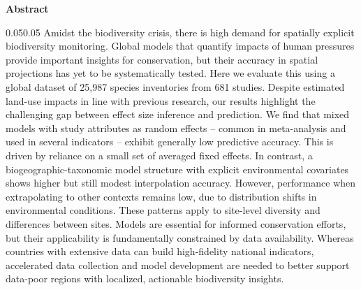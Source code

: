 
\vspace{3\baselineskip}

\begin{center}
  {\large\bfseries Abstract}
\end{center}
\vspace{0.25\baselineskip}

\begin{adjustwidth}{0.05\textwidth}{0.05\textwidth} %
\noindent
Amidst the biodiversity crisis, there is high demand for spatially explicit biodiversity monitoring. Global models that quantify impacts of human pressures provide important insights for conservation, but their accuracy in spatial projections has yet to be systematically tested. Here we evaluate this using a global dataset of 25,987 species inventories from 681 studies. Despite estimated land-use impacts in line with previous research, our results highlight the challenging gap between effect size inference and prediction. We find that mixed models with study attributes as random effects -- common in meta-analysis and used in several indicators -- exhibit generally low predictive accuracy. This is driven by reliance on a small set of averaged fixed effects. In contrast, a biogeographic-taxonomic model structure with explicit environmental covariates shows higher but still modest interpolation accuracy. However, performance when extrapolating to other contexts remains low, due to distribution shifts in environmental conditions. These patterns apply to site-level diversity and differences between sites. Models are essential for informed conservation efforts, but their applicability is fundamentally constrained by data availability. Whereas countries with extensive data can build high-fidelity national indicators, accelerated data collection and model development are needed to better support data-poor regions with localized, actionable biodiversity insights.
\end{adjustwidth}
